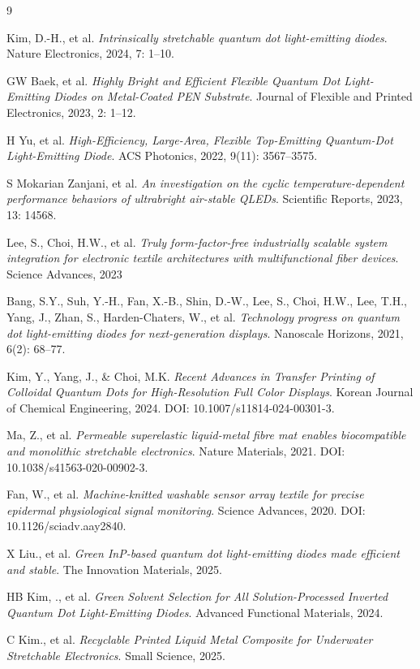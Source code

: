 \documentclass[12pt,a4paper]{article}
\begin{document}
\clearpage
\begin{thebibliography}{9}

Kim, D.-H., et al.
\textit{Intrinsically stretchable quantum dot light-emitting diodes}.
Nature Electronics, 2024, 7: 1--10.

GW Baek, et al.
\textit{Highly Bright and Efficient Flexible Quantum Dot Light-Emitting Diodes on Metal-Coated PEN Substrate}.
Journal of Flexible and Printed Electronics, 2023, 2: 1--12.

H Yu, et al.
\textit{High-Efficiency, Large-Area, Flexible Top-Emitting Quantum-Dot Light-Emitting Diode}.
ACS Photonics, 2022, 9(11): 3567--3575.

S Mokarian Zanjani, et al.
\textit{An investigation on the cyclic temperature-dependent performance behaviors of ultrabright air-stable QLEDs}.
Scientific Reports, 2023, 13: 14568.

Lee, S., Choi, H.W., et al.
\textit{Truly form-factor-free industrially scalable system integration for electronic textile architectures with multifunctional fiber devices}.
Science Advances, 2023

Bang, S.Y., Suh, Y.-H., Fan, X.-B., Shin, D.-W., Lee, S., Choi, H.W., Lee, T.H., Yang, J., Zhan, S., Harden-Chaters, W., et al.
\textit{Technology progress on quantum dot light-emitting diodes for next-generation displays}.
Nanoscale Horizons, 2021, 6(2): 68--77.

Kim, Y., Yang, J., \& Choi, M.K.
\textit{Recent Advances in Transfer Printing of Colloidal Quantum Dots for High-Resolution Full Color Displays}.
Korean Journal of Chemical Engineering, 2024.
DOI: 10.1007/s11814-024-00301-3.

Ma, Z., et al.
\textit{Permeable superelastic liquid-metal fibre mat enables biocompatible and monolithic stretchable electronics}.
Nature Materials, 2021.
DOI: 10.1038/s41563-020-00902-3.

Fan, W., et al.
\textit{Machine-knitted washable sensor array textile for precise epidermal physiological signal monitoring}.
Science Advances, 2020.
DOI: 10.1126/sciadv.aay2840.

X Liu., et al.
\textit{Green InP-based quantum dot light-emitting diodes made efficient and stable}.
The Innovation Materials, 2025.

HB Kim, ., et al.
\textit{Green Solvent Selection for All Solution-Processed Inverted Quantum Dot Light-Emitting Diodes}.
Advanced Functional Materials, 2024.

C Kim., et al.
\textit{Recyclable Printed Liquid Metal Composite for Underwater Stretchable Electronics}.
Small Science, 2025.

\end{thebibliography}
\end{document}
